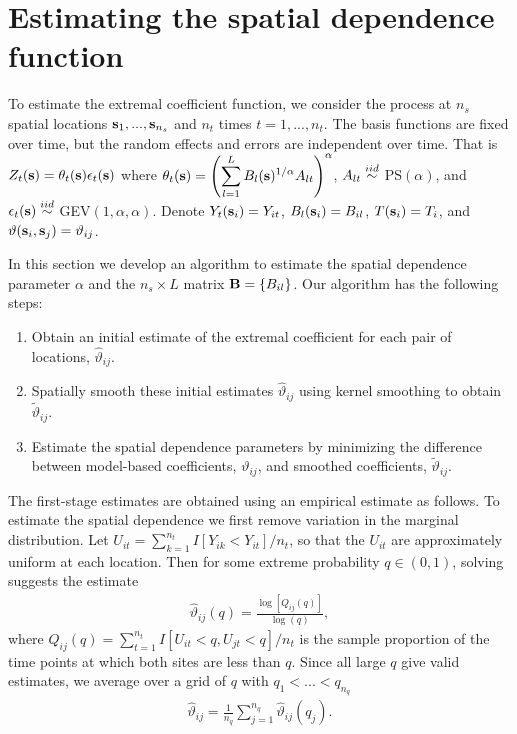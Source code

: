 \section{Estimating the spatial dependence function}\label{ebs:estimation}
To estimate the extremal coefficient function, we consider the process at $n_s$ spatial locations $\mathbf{s}_1,...,\mathbf{s}_{n_s}$ and $n_t$ times $t=1,...,n_t$.
The basis functions are fixed over time, but the random effects and errors are independent over time.
That is $Z_t(\mathbf{s}) = \theta_t(\mathbf{s}) \epsilon_t(\mathbf{s})$ where $\theta_t(\mathbf{s}) = \left(\displaystyle \sum_{l=1}^L B_{l}(\mathbf{s})^{1/\alpha}A_{lt}\right)^{\alpha}$, $A_{lt} \stackrel{iid}{\sim}$ PS$(\alpha)$, and $\epsilon_t(\mathbf{s}) \stackrel{iid}{\sim}$ GEV$(1, \alpha, \alpha)$.
Denote $Y_t(\mathbf{s}_i) = Y_{it}$, $B_l(\mathbf{s}_i) = B_{il}$, $T(\mathbf{s}_i)=T_i$, and $\vartheta(\mathbf{s}_i,\mathbf{s}_j) = \vartheta_{ij}$.

In this section we develop an algorithm to estimate the spatial dependence parameter $\alpha$ and the $n_s\times L$ matrix $\mathbf{B} = \{B_{il}\}$.
Our algorithm has the following steps:
\begin{enumerate}[(1)]
  \item Obtain an initial estimate of the extremal coefficient for each pair of locations, ${\hat \vartheta}_{ij}$.
  \item Spatially smooth these initial estimates ${\hat \vartheta}_{ij}$ using kernel smoothing to obtain ${\tilde \vartheta}_{ij}$.
  \item Estimate the spatial dependence parameters by minimizing the difference between model-based coefficients, $\vartheta_{ij}$, and smoothed coefficients, ${\tilde \vartheta}_{ij}$.
\end{enumerate}

The first-stage estimates are obtained using an empirical estimate as follows.
To estimate the spatial dependence we first remove variation in the marginal distribution.
Let $U_{it} = \sum_{k=1}^{n_t} I[Y_{ik}<Y_{it}]/n_t$, so that the $U_{it}$ are approximately uniform at each location.
Then for some extreme probability $q\in(0,1)$, solving  suggests the estimate
\begin{align}\label{ebeq:EChat0}
   {\hat \vartheta}_{ij}(q) = \frac{\log[Q_{ij}(q)]}{\log(q)},
\end{align}
where $Q_{ij}(q) = \sum_{t=1}^{n_t}I[U_{it}<q,U_{jt}<q]/n_t$ is the sample proportion of the time points at which both sites are less than $q$.
Since all large $q$ give valid estimates, we average over a grid of $q$ with $q_1<...<q_{n_q}$
\begin{align} \label{ebeq:EChat1}
{\hat \vartheta}_{ij} = \frac{1}{n_q}\sum_{j=1}^{n_q}{\hat \vartheta}_{ij}(q_j).
\end{align}

